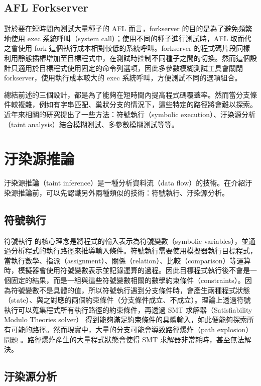 \subsection{AFL Forkserver}

對於要在短時間內測試大量種子的 AFL 而言，forkserver 的目的是為了避免頻繁地使用 exec 系統呼叫（system call）；使用不同的種子進行測試時，AFL 取而代之會使用 fork 這個執行成本相對較低的系統呼叫。forkserver 的程式碼片段同樣利用靜態插樁增加至目標程式中，在測試時控制不同種子之間的切換。然而這個設計只適用於目標程式使用固定的命令列選項，因此多參數模糊測試工具會關閉 forkserver，使用執行成本較大的 exec 系統呼叫，方便測試不同的選項組合。

總結前述的三個設計，都是為了能夠在短時間內提高程式碼覆蓋率。然而當分支條件較複雜，例如有字串匹配、巢狀分支的情況下，這些特定的路徑將會難以探索。近年來相關的研究提出了一些方法：符號執行（symbolic execution）、汙染源分析（taint analysis）結合模糊測試、多參數模糊測試等等。

\section{汙染源推論}

汙染源推論（taint inference）是一種分析資料流（data flow）的技術。在介紹汙染源推論前，可以先認識另外兩種類似的技術：符號執行、汙染源分析。

\subsection{符號執行}

符號執行 \cite{king1976symbolic} 的核心理念是將程式的輸入表示為符號變數（symbolic variables），並通過分析程式的執行路徑來推導輸入條件。符號執行需要使用模擬器執行目標程式，當執行數學、指派（assignment）、關係（relation）、比較（comparison）等運算時，模擬器會使用符號變數表示並記錄運算的過程。因此目標程式執行後不會是一個固定的結果，而是一組與這些符號變數相關的數學約束條件（constraints）。因為符號變數不是具體的值，所以符號執行遇到分支條件時，會產生兩種程式狀態（state）、與之對應的兩個約束條件（分支條件成立、不成立）。理論上透過符號執行可以蒐集程式所有執行路徑的約束條件，再透過 SMT 求解器（Satisfiability Modulo Theories solver）\cite{barrett2018satisfiability} 得到能夠滿足約束條件的具體輸入，如此便能夠探索所有可能的路徑。然而現實中，大量的分支可能會導致路徑爆炸（path explosion）問題 \cite{boonstoppel2008rwset, krishnamoorthy2010tackling}。路徑爆炸產生的大量程式狀態會使得 SMT 求解器非常耗時，甚至無法解決。

\subsection{汙染源分析}

